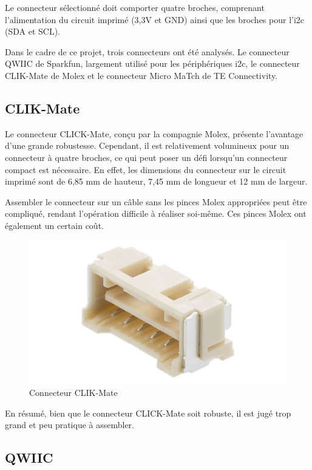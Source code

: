 Le connecteur sélectionné doit comporter quatre broches, comprenant l'alimentation du circuit imprimé (3,3V et GND) ainsi que les broches pour l'\gls{i2c} (SDA et SCL).

Dans le cadre de ce projet, trois connecteurs ont été analysés.
Le connecteur QWIIC de Sparkfun, largement utilisé pour les périphériques \gls{i2c}, le connecteur CLIK-Mate de Molex et le connecteur Micro MaTch de TE Connectivity.

\subsection{CLIK-Mate}

Le connecteur CLICK-Mate, conçu par la compagnie Molex, présente l'avantage d'une grande robustesse.
Cependant, il est relativement volumineux pour un connecteur à quatre broches, ce qui peut poser un défi lorsqu'un connecteur compact est nécessaire.
En effet, les dimensions du connecteur sur le circuit imprimé sont de 6,85 mm de hauteur, 7,45 mm de longueur et 12 mm de largeur.

Assembler le connecteur sur un câble sans les pinces Molex appropriées peut être compliqué, rendant l'opération difficile à réaliser soi-même. Ces pinces Molex ont également un certain coût.

\begin{figure}[H]
    \centering
    \includegraphics[scale=0.085]{./assets/figures/clik_mate.jpg}
    \caption{\cite{clikmate} Connecteur CLIK-Mate}
\end{figure}

En résumé, bien que le connecteur CLICK-Mate soit robuste, il est jugé trop grand et peu pratique à assembler.

\subsection{QWIIC}

